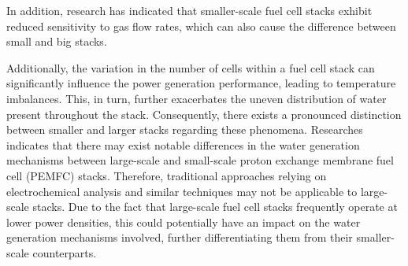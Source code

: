 \par
In addition, research has indicated that smaller-scale fuel cell stacks exhibit reduced sensitivity to gas flow rates\cite{bonnetDesign80kWePEM2008}, which can also cause the difference between small and big stacks.
\par
Additionally, the variation in the number of cells within a fuel cell stack can significantly influence the power generation performance, leading to temperature imbalances\cite{millerReviewPolymerElectrolyte2011}. This, in turn, further exacerbates the uneven distribution of water present throughout the stack. Consequently, there exists a pronounced distinction between smaller and larger stacks regarding these phenomena.
Researches indicates that there may exist notable differences in the water generation mechanisms between large-scale and small-scale proton exchange membrane fuel cell (PEMFC) stacks\cite{jiReviewWaterManagement2009}. Therefore, traditional approaches relying on electrochemical analysis and similar techniques may not be applicable to large-scale stacks. Due to the fact that large-scale fuel cell stacks frequently operate at lower power densities\cite{shojayianSimulationCathodeCatalyst2024}, this could potentially have an impact on the water generation mechanisms involved, further differentiating them from their smaller-scale counterparts.

